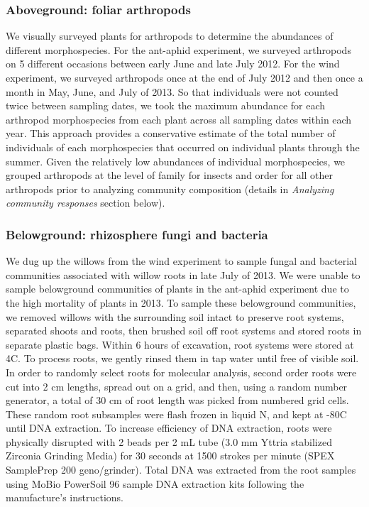 \documentclass[11pt]{article}
\begin{document}
\subsubsection*{Aboveground: foliar arthropods}

We visually surveyed plants for arthropods to
determine the abundances of different morphospecies. For the ant-aphid
experiment, we surveyed arthropods on 5 different occasions between
early June and late July 2012. For the wind experiment, we surveyed
arthropods once at the end of July 2012 and then once a month in May,
June, and July of 2013. So that individuals were not counted twice
between sampling dates, we took the maximum abundance for each arthropod
morphospecies from each plant across all sampling dates within each
year. This approach provides a conservative estimate of the total number
of individuals of each morphospecies that occurred on individual
plants through the summer. Given the relatively low abundances of
individual morphospecies, we grouped arthropods at the level of family
for insects and order for all other arthropods prior to
analyzing community composition (details in \emph{Analyzing community responses} section below).

\subsubsection*{Belowground: rhizosphere fungi and bacteria}

We dug up the willows from the wind experiment
to sample fungal and bacterial communities associated with willow roots
in late July of 2013. We were unable to sample belowground communities of
plants in the ant-aphid experiment due to the high mortality of plants
in 2013. To sample these belowground communities, we removed willows
with the surrounding soil intact to preserve root systems, separated
shoots and roots, then brushed soil off root systems and stored roots in
separate plastic bags. Within 6 hours of excavation, root systems were
stored at 4\degree C. To process roots, we gently rinsed them in tap water
until free of visible soil. In order to randomly select roots for
molecular analysis, second order roots were cut into 2 cm lengths,
spread out on a grid, and then, using a random number generator, a total
of 30 cm of root length was picked from numbered grid cells. These
random root subsamples were flash frozen in liquid N, and kept at -80\degree C
until DNA extraction. To increase efficiency of DNA extraction, roots
were physically disrupted with 2 beads per 2 mL tube (3.0 mm Yttria
stabilized Zirconia Grinding Media) for 30 seconds at 1500 strokes per
minute (SPEX SamplePrep 200 geno/grinder). Total DNA was extracted from
the root samples using MoBio PowerSoil 96 sample DNA
extraction kits following the manufacture's instructions.
\end{document}
